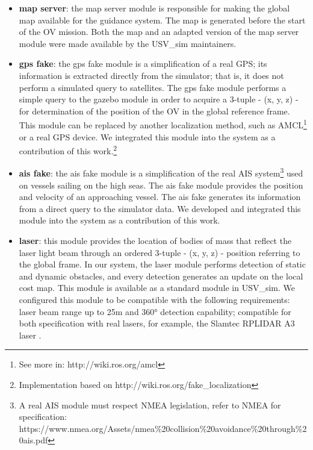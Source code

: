     \begin{itemize}
    
        \item \textbf{map server}: the map server module is responsible for making the global map available for the guidance system. The map is generated before the start of the \ac{OV} mission. Both the map and an adapted version of the map server module were made available by the USV\_sim maintainers.
    
        \item \textbf{gps fake}: the gps fake module is a simplification of a real GPS; its information is extracted directly from the simulator; that is, it does not perform a simulated query to satellites. The gps fake module performs a simple query to the gazebo module in order to acquire a 3-tuple - (x, y, z) - for determination of the position of the \ac{OV} in the global reference frame. This module can be replaced by another localization method, such as \ac{AMCL}\footnote{See more in: http://wiki.ros.org/amcl} or a real GPS device. We integrated this module into the system as a contribution of this work.\footnote{Implementation based on http://wiki.ros.org/fake\_localization}
    
        \item \textbf{ais fake}: the ais fake module is a simplification of the real AIS system\footnote{A real AIS module must respect NMEA legislation, refer to NMEA for specification: https://www.nmea.org/Assets/nmea\%20collision\%20avoidance\%20through\%20ais.pdf} used on vessels sailing on the high seas. The ais fake module provides the position and velocity of an approaching vessel. The ais fake generates its information from a direct query to the simulator data. We developed and integrated this module into the system as a contribution of this work.
    
        \item \textbf{laser}: this module provides the location of bodies of mass that reflect the laser light beam through an ordered 3-tuple - (x, y, z) - position referring to the global frame. In our system, the laser module performs detection of static and dynamic obstacles, and every detection generates an update on the local cost map. This module is available as a standard module in USV\_sim. We configured this module to be compatible with the following requirements: laser beam range up to 25m and 360° detection capability; compatible for both specification with real lasers, for example, the Slamtec RPLIDAR A3 laser \cite{RPLidarA3}.
    
    \end{itemize}
    
